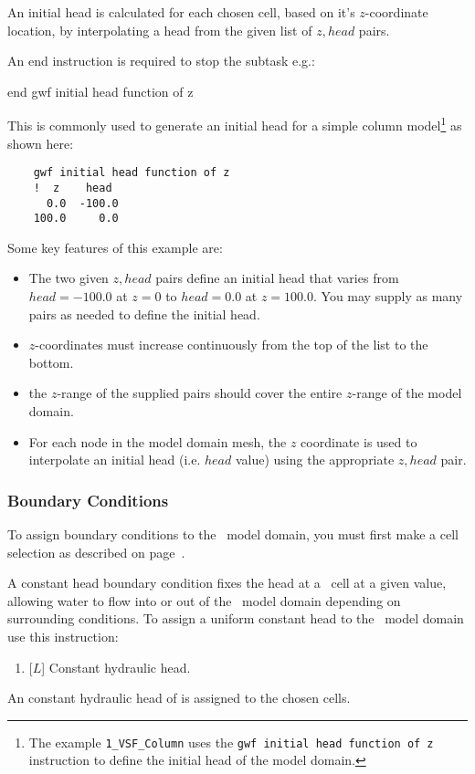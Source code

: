 {{     An initial head is calculated for each chosen cell, based on it's $z$-coordinate location, by interpolating a head from the given list of  $z, head$ pairs.

    An end instruction is required to stop the subtask e.g.:

    {\Large \sf end gwf initial head function of z}
    }

This is commonly used to generate an initial head for a simple column model\footnote{The example \texttt{1\_VSF\_Column} uses the \texttt{gwf initial head function of z} instruction to define the initial head of the model domain.} as shown here:
\begin{verbatim}
    gwf initial head function of z
    !  z    head
      0.0  -100.0
    100.0     0.0
\end{verbatim}
\pagebreak
Some key features of this example are:
\begin{itemize}
  \item The two given $z,head$ pairs define an initial head  that varies from $head=-100.0$ at $z=0$ to $head=0.0$ at $z=100.0$.  You may supply as many pairs as needed to define the initial head.
  \item $z$-coordinates must increase continuously from the top of the list to the bottom.
  \item the $z$-range of the supplied pairs should cover the entire $z$-range of the model domain.
  \item For each node in the model domain  mesh, the $z$ coordinate is used to interpolate an initial head (i.e. $head$ value) using the appropriate $z, head$ pair.
\end{itemize}

\subsubsection{Boundary Conditions}  
To assign boundary conditions  to the \gwf\ model domain, you must first make a cell selection as described on page~\pageref{page:cellSelect}.

A constant head boundary condition fixes the head at a \gwf\ cell at a given value, allowing water to flow into or out of the \gwf\ model domain depending on surrounding conditions.    To assign a uniform constant head to the \gwf\ model domain use this instruction:

    {
        \squish
        \begin{enumerate}
        \item {} [$L$]   Constant hydraulic head.
        \end{enumerate}
          An constant hydraulic head  of  is assigned to the chosen cells.
    }

}
